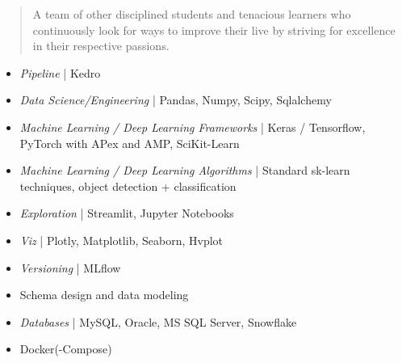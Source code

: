 \documentclass[10pt,a4paper,ragged2e,withhyper]{altacv}
\begin{document}
\begin{paracol}{2}
\switchcolumn


\begin{quote}
\justify
A team of other disciplined students and tenacious learners who continuously look for ways to improve their live by striving for excellence in their respective passions.
\end{quote}


\begin{itemize}
\item \textit{{\faStream} Pipeline} | Kedro 
\item \textit{{\faAtom} Data Science/Engineering} | Pandas, Numpy, Scipy, Sqlalchemy
\item \textit{{\faProjectDiagram} Machine Learning / Deep Learning Frameworks} | Keras / Tensorflow, PyTorch with APex and AMP, SciKit-Learn
\item \textit{{\faBrain} Machine Learning / Deep Learning Algorithms} | Standard sk-learn techniques, object detection + classification 
\item \textit{{\faEye} Exploration} | Streamlit, Jupyter Notebooks
\item \textit{{\faChartPie} Viz} | Plotly, Matplotlib, Seaborn, Hvplot
\item \textit{{\faCodeBranch} Versioning} | MLflow

\end{itemize}


\begin{itemize}
\item Schema design and data modeling
\item \textit{Databases} | MySQL, Oracle, MS SQL Server, Snowflake
\end{itemize}


\begin{itemize}
\item Docker(-Compose)
\end{itemize}


\end{paracol}
\end{document}
